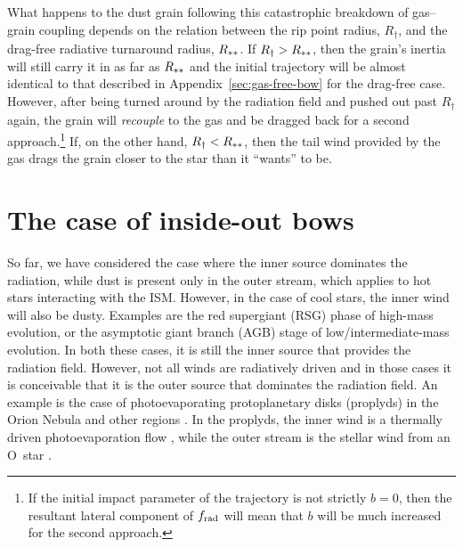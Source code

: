 What happens to the dust grain following this catastrophic breakdown
of gas--grain coupling depends on the relation between the rip point
radius, \(R_\dag\), and the drag-free radiative turnaround radius,
\(R_{**}\).  If \(R_\dag > R_{**}\), then the grain's inertia
will still carry it in as far as \(R_{**}\) and the initial
trajectory will be almost identical to that described in
Appendix~\ref{sec:gas-free-bow} for the drag-free case. However, after
being turned around by the radiation field and pushed out past
\(R_\dag\) again, the grain will \emph{recouple} to the gas and be
dragged back for a second approach.\footnote{If the initial impact
  parameter of the trajectory is not strictly \(b = 0\), then the
  resultant lateral component of \(f_{\text{rad}}\) will mean that \(b\) will
  be much increased for the second approach.} %
If, on the other hand, \(R_\dag < R_{**}\), then the tail wind
provided by the gas drags the grain closer to the star than it
``wants'' to be. 


\section{The case of inside-out bows}
\label{sec:case-inside-out}

So far, we have considered the case where the inner source dominates
the radiation, while dust is present only in the outer stream, which
applies to hot stars interacting with the ISM.  However, in the case
of cool stars, the inner wind will also be dusty.  Examples are the
red supergiant (RSG) phase of high-mass evolution, or the asymptotic
giant branch (AGB) stage of low/intermediate-mass evolution.  In both
these cases, it is still the inner source that provides the radiation
field.  However, not all winds are radiatively driven and in those
cases it is conceivable that it is the outer source that dominates the
radiation field.  An example is the case of photoevaporating
protoplanetary disks (proplyds) in the Orion Nebula and other \hii{}
regions \citep{ODell:1994a}.  In the proplyds, the inner wind is a
thermally driven photoevaporation flow \citep{HA:1998, Henney:1999a},
while the outer stream is the stellar wind from an O~star
\citep{Garcia-Arredondo:2001a}.


